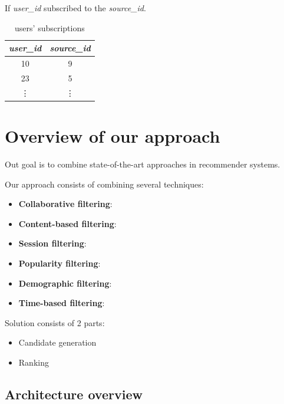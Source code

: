 \documentclass{article}
\begin{document}
    If \emph{user\_id} subscribed to the \emph{source\_id}.

    \begin{table}[h]
        \centering
        \begin{tabular}{cc}
            \toprule

            \emph{user\_id} & \emph{source\_id} \\\midrule

            10 & 9  \\
            23 & 5  \\
            \vdots & \vdots  \\\bottomrule

        \end{tabular}

        \caption{users' subscriptions}
        \label{tab:subscriptions}
    \end{table}




    \section{Overview of our approach}
    \label{sec:overview}

    Out goal is to combine state-of-the-art approaches in recommender systems.

    Our approach consists of combining several techniques:

    \begin{itemize}
        \item \textbf{Collaborative filtering}: 
        \item \textbf{Content-based filtering}:
        \item \textbf{Session filtering}:
        \item \textbf{Popularity filtering}:
        \item \textbf{Demographic filtering}:
        \item \textbf{Time-based filtering}:
    \end{itemize}

    Solution consists of 2 parts:


    \begin{itemize}
        \item Candidate generation
        \item Ranking
    \end{itemize}

    \subsection{Architecture overview}
\end{document}
